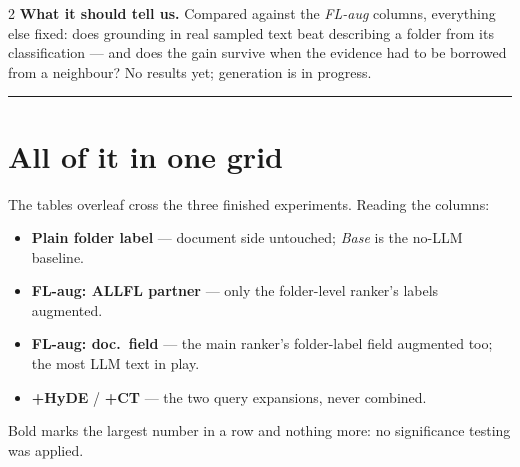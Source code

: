 \documentclass[a4paper,11pt]{article}
\newcommand{\partrule}{\vspace{2pt}\hrule\vspace{6pt}}
\begin{document}
\begin{multicols}{2}
\textbf{What it should tell us.} Compared against the \emph{FL-aug} columns, everything else
fixed: does grounding in real sampled text beat describing a folder from its classification
--- and does the gain survive when the evidence had to be borrowed from a neighbour? No
results yet; generation is in progress.

\partrule

\section{All of it in one grid}

The tables overleaf cross the three finished experiments. Reading the columns:

\begin{itemize}
\item \textbf{Plain folder label} --- document side untouched; \emph{Base} is the no-LLM
      baseline.
\item \textbf{FL-aug: ALLFL partner} --- only the folder-level ranker's labels augmented.
\item \textbf{FL-aug: doc.\ field} --- the main ranker's folder-label field augmented too;
      the most LLM text in play.
\item \textbf{+HyDE} / \textbf{+CT} --- the two query expansions, never combined.
\end{itemize}

Bold marks the largest number in a row and nothing more: no significance testing was applied.

\end{multicols}

\clearpage


\end{document}
